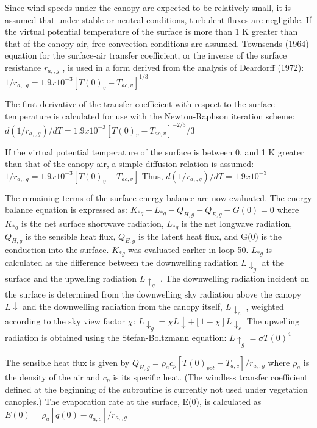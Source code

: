 Since wind speeds under the canopy are expected to be relatively small, it is assumed that under stable or neutral conditions, turbulent fluxes are negligible. If the virtual potential temperature of the surface is more than 1 K greater than that of the canopy air, free convection conditions are assumed. Townsend\textquotesingle{}s (1964) equation for the surface-\/air transfer coefficient, or the inverse of the surface resistance $r_{a,,g}$ , is used in a form derived from the analysis of Deardorff (1972)\+: $1/r_{a,,g} = 1.9 x 10^{-3} [T(0)_v - T_{ac,v} ]^{1/3}$

The first derivative of the transfer coefficient with respect to the surface temperature is calculated for use with the Newton-\/\+Raphson iteration scheme\+: $d(1/r_{a,,g} )/dT = 1.9 x 10^{-3} [T(0)_v - T_{ac,v} ]^{-2/3} /3$

If the virtual potential temperature of the surface is between 0. and 1 K greater than that of the canopy air, a simple diffusion relation is assumed\+: $1/r_{a,,g} = 1.9 x 10^{-3} [T(0)_v - T_{ac,v} ]$ Thus, $d(1/r_{a,,g} )/dT = 1.9 x 10^{-3}$

The remaining terms of the surface energy balance are now evaluated. The energy balance equation is expressed as\+: $K_{*g} + L_{*g} - Q_{H,g} - Q_{E,g} - G(0) = 0$ where $K_{*g}$ is the net surface shortwave radiation, $L_{*g}$ is the net longwave radiation, $Q_{H,g}$ is the sensible heat flux, $Q_{E,g}$ is the latent heat flux, and G(0) is the conduction into the surface. $K_{*g}$ was evaluated earlier in loop 50. $L_{*g}$ is calculated as the difference between the downwelling radiation $L \downarrow_g$ at the surface and the upwelling radiation $L \uparrow_g$ . The downwelling radiation incident on the surface is determined from the downwelling sky radiation above the canopy $L \downarrow$ and the downwelling radiation from the canopy itself, $L \downarrow_c$ , weighted according to the sky view factor $\chi$\+: $L \downarrow_g = \chi L \downarrow + [1 - \chi] L \downarrow_c$ The upwelling radiation is obtained using the Stefan-\/\+Boltzmann equation\+: $L \uparrow_g = \sigma T(0)^4$

The sensible heat flux is given by $Q_{H,g} = \rho_a c_p [T(0)_{pot} - T_{a,c} ]/r_{a,,g}$ where $\rho_a$ is the density of the air and $c_p$ is its specific heat. (The windless transfer coefficient defined at the beginning of the subroutine is currently not used under vegetation canopies.) The evaporation rate at the surface, E(0), is calculated as $E(0) = \rho_a [q(0) - q_{a,c} ]/r_{a,,g}$

